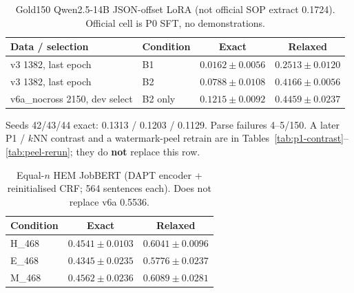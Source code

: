 \begin{table}[t]
\caption{Gold150 Qwen2.5-14B JSON-offset LoRA (not official SOP extract 0.1724). Official cell is P0 SFT, no demonstrations.}
\label{tab:gold150-qwen}
\centering
\begin{tabular}{llcc}
\hline
Data / selection & Condition & Exact & Relaxed \\
\hline
v3 1382, last epoch & B1 & $0.0162\pm0.0056$ & $0.2513\pm0.0120$ \\
v3 1382, last epoch & B2 & $0.0788\pm0.0108$ & $0.4166\pm0.0056$ \\
v6a\_nocross 2150, dev select & B2 only & $\mathbf{0.1215\pm0.0092}$ & $0.4459\pm0.0237$ \\
\hline
\end{tabular}

\vspace{0.4em}
{\small Seeds 42/43/44 exact: 0.1313 / 0.1203 / 0.1129.
Parse failures 4--5/150.
A later P1 / $k$NN contrast and a watermark-peel retrain are in Tables~\ref{tab:p1-contrast}--\ref{tab:peel-rerun}; they do \textbf{not} replace this row.}
\end{table}

\begin{table}[t]
\caption{Equal-$n$ HEM JobBERT (DAPT encoder + reinitialised CRF; 564 sentences each). Does not replace v6a 0.5536.}
\label{tab:hem}
\centering
\begin{tabular}{lcc}
\hline
Condition & Exact & Relaxed \\
\hline
H\_468 & $0.4541\pm0.0103$ & $0.6041\pm0.0096$ \\
E\_468 & $0.4345\pm0.0235$ & $0.5776\pm0.0237$ \\
M\_468 & $0.4562\pm0.0236$ & $0.6089\pm0.0281$ \\
\hline
\end{tabular}
\end{table}
